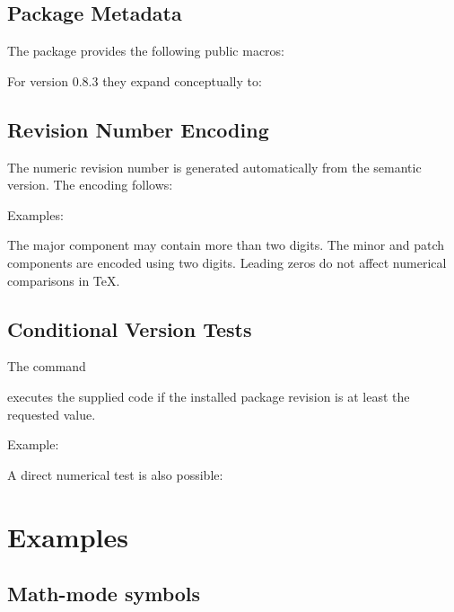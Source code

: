 \documentclass[
11pt,
a4paper,
oneside
]{scrbook}
\begin{document}
\section{Package Metadata}

The package provides the following public macros:




For version 0.8.3 they expand conceptually to:





\section{Revision Number Encoding}

The numeric revision number is generated automatically from the semantic
version.
The encoding follows:




Examples:




The major component may contain more than two digits.
The minor and patch components are encoded using two digits.
Leading zeros do not affect numerical comparisons in TeX.
\section{Conditional Version Tests}

The command




executes the supplied code if the installed package revision is at least the
requested value.

\noindent Example:




A direct numerical test is also possible:







\chapter{Examples}

\section{Math-mode symbols}
\end{document}

